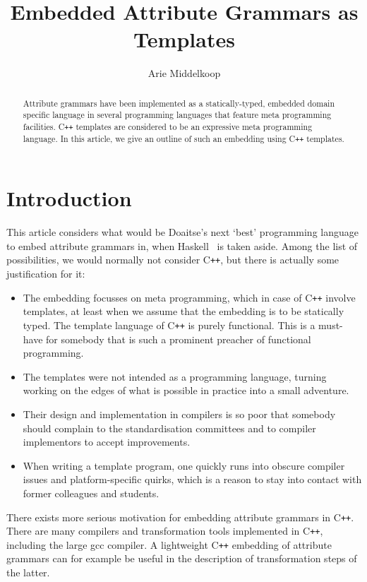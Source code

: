 \documentclass{llncs}
\title{Embedded Attribute Grammars as \Cpp{} Templates}
\author{Arie Middelkoop}
\institute{\email{amiddelk@gmail.com}}
\newcommand*{\Cpp}{C\texttt{++}}
\begin{document}
  \maketitle

  \begin{abstract}
  Attribute grammars have been implemented as a statically-typed,
  embedded domain specific language
  in several programming languages that feature meta programming facilities.
  \Cpp{} templates are considered to be an expressive meta programming language.
  In this article, we give an outline of such an embedding using \Cpp{} templates.
  \end{abstract}
 
\section{Introduction}
\label{sec:introduction}

  This article considers what would be Doaitse's next `best' programming language 
  to embed attribute grammars in, when Haskell~\cite{DBLP:conf/sblp/VieraS12} is taken aside.
  Among the list of possibilities, we would normally not consider \Cpp, but
  there is actually some justification for it:
  \begin{itemize}
  \item The embedding focusses on meta programming, which in case of
    \Cpp{} involve templates, at least when we assume that the embedding
    is to be statically typed.
    The template language of \Cpp{} is purely functional. This is a must-have for
    somebody that is such a prominent preacher of functional programming.
  \item The templates were not intended as a programming language, turning
    working on the edges of what is possible in practice into a small
    adventure.
  \item
    Their design and implementation in compilers is so poor that somebody
    should complain to the standardisation committees and to compiler
    implementors to accept improvements.
  \item
    When writing a template program, one quickly runs into
    obscure compiler issues and platform-specific quirks, which is a
    reason to stay into contact with former colleagues and students.
  \end{itemize}
  There exists more serious motivation for embedding
  attribute grammars in \Cpp. There are many compilers
  and transformation tools implemented in \Cpp, including the
  large gcc compiler. A lightweight \Cpp{}
  embedding of attribute grammars can for example be useful in the
  description of transformation steps of the latter.
\end{document}
